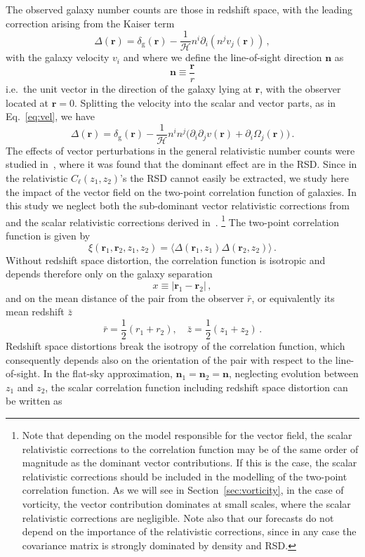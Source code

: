 \documentclass[a4paper,twocolumn,aps,prd,nolongbibliography,superscriptaddress,showpacs,showkeys,amsmath,amssymb,floatfix,nofootinbib]{revtex4-1}
\renewcommand{\[}{\begin{equation}}
\renewcommand{\]}{\end{equation}}
\newcommand{\gs}{\mathrm{g}}
\newcommand{\rb}{\boldsymbol{r}}
\newcommand{\nb}{\boldsymbol{n}}
\begin{document}
The observed galaxy number counts are those in redshift space, with the leading correction arising from the Kaiser term \cite{Kaiser:1987qv}
\[
\Delta(\rb)=\delta_\gs(\rb)-\frac{1}{\mathcal{H}}n^{i}\partial_{i}(n^{j}v_{j}(\rb))\,,
\]
with the galaxy velocity $v_i$ and where we define the line-of-sight direction $\nb$ as 
\[
\nb\equiv\frac{\rb}{r}
\]
i.e.\ the unit vector in the direction of the galaxy lying at $\boldsymbol{r}$, with the observer
located at $\boldsymbol{r}=0$.
Splitting the velocity into the scalar and vector parts, as in Eq.~\eqref{eq:vel}, we have
\begin{equation}
\Delta(\rb)=\delta_\gs(\rb)-\frac{1}{\mathcal{H}}n^{i}n^{j}\big(\partial_{i}\partial_{j}v(\rb)+\partial_{i}\Omega_{j}(\rb)\big) \, .\label{eq:deltaz}
\end{equation}
The effects of vector perturbations in the general relativistic number counts were studied in~\cite{Durrer:2016jzq}, where it was found that the dominant effect are in the RSD. Since in the relativistic $C_\ell(z_1,z_2)$'s the RSD cannot easily be extracted, we study here the impact of the vector field on the two-point correlation function of galaxies. In this study we neglect both the sub-dominant vector relativistic corrections from~\cite{Durrer:2016jzq} and the scalar relativistic corrections derived in~\cite{Yoo:2009au,Bonvin:2011bg,Challinor:2011bk}.%
\footnote{Note that depending on the model responsible for the vector field, the scalar relativistic corrections to the correlation function may be of the same order of magnitude as the dominant vector contributions. If this is the case, the scalar relativistic corrections should be included in the modelling of the two-point correlation function. As we will see in Section~\ref{sec:vorticity}, in the case of vorticity, the vector contribution dominates at small scales, where the scalar relativistic corrections are negligible. Note also that our forecasts do not depend on the importance of the relativistic corrections, since in any case the covariance matrix is strongly dominated by density and RSD.} %
The two-point correlation function is given by
\[
\xi(\rb_1,\rb_2,z_1,z_2)=\langle \Delta(\rb_1,z_1)\Delta(\rb_2,z_2) \rangle\, .
\]
Without redshift space distortion, the correlation function is isotropic and depends therefore only on the galaxy separation
\[
x \equiv |\rb_1 - \rb_2|\, ,
\]
and on the mean distance of the pair from the observer $\bar r$, or equivalently its mean redshift $\bar z$
\[
\bar r =\frac{1}{2}(r_1 + r_2), \quad \bar z=\frac{1}{2}(z_1 + z_2)\, .
\]
Redshift space distortions break the isotropy of the correlation function, which consequently depends also on the orientation of the pair with respect to the line-of-sight. In the flat-sky approximation, $\nb_1=\nb_2=\nb$, neglecting evolution between $z_1$ and $z_2$, the scalar correlation function including redshift space distortion  can be written as
\end{document}

